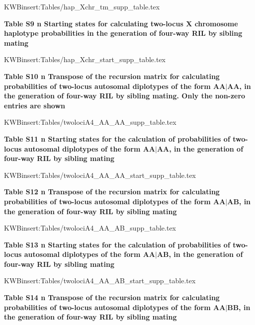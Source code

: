 \documentclass[9pt,letterpaper,twoside]{article}
\begin{document}
{
KWBinsert:Tables/hap_Xchr_tm_supp_table.tex
}

\newpage

\noindent \textbf{Table S9 {\color{white} n} Starting states for calculating
two-locus X chromosome haplotype probabilities in the generation of four-way RIL by
sibling mating}

\bigskip

{
KWBinsert:Tables/hap_Xchr_start_supp_table.tex
}

\newpage

\noindent \textbf{Table S10 {\color{white} n} Transpose of the recursion matrix for
calculating probabilities of two-locus autosomal diplotypes of the form $\boldsymbol{\boldsymbol{AA|AA}}$,
in the generation of four-way RIL by sibling mating.  Only the
non-zero entries are shown}

\bigskip

{
KWBinsert:Tables/twolociA4_AA_AA_supp_table.tex
}

\newpage

\noindent \textbf{Table S11 {\color{white} n} Starting states for the calculation of
probabilities of two-locus autosomal diplotypes of the form $\boldsymbol{AA|AA}$,
in the generation of four-way RIL by sibling mating}

\bigskip

{
KWBinsert:Tables/twolociA4_AA_AA_start_supp_table.tex
}

\newpage

\noindent \textbf{Table S12 {\color{white} n} Transpose of the recursion matrix for
calculating probabilities of two-locus autosomal diplotypes of the form $\boldsymbol{AA|AB}$,
in the generation of four-way RIL by sibling mating}

\bigskip

{
KWBinsert:Tables/twolociA4_AA_AB_supp_table.tex
}

\newpage

\noindent \textbf{Table S13 {\color{white} n} Starting states for the calculation of
probabilities of two-locus autosomal diplotypes of the form $\boldsymbol{AA|AB}$,
in the generation of four-way RIL by sibling mating}

\bigskip

{
KWBinsert:Tables/twolociA4_AA_AB_start_supp_table.tex
}

\newpage

\noindent \textbf{Table S14 {\color{white} n} Transpose of the recursion matrix for
calculating probabilities of two-locus autosomal diplotypes of the form $\boldsymbol{AA|BB}$,
in the generation of four-way RIL by sibling mating}
\end{document}
